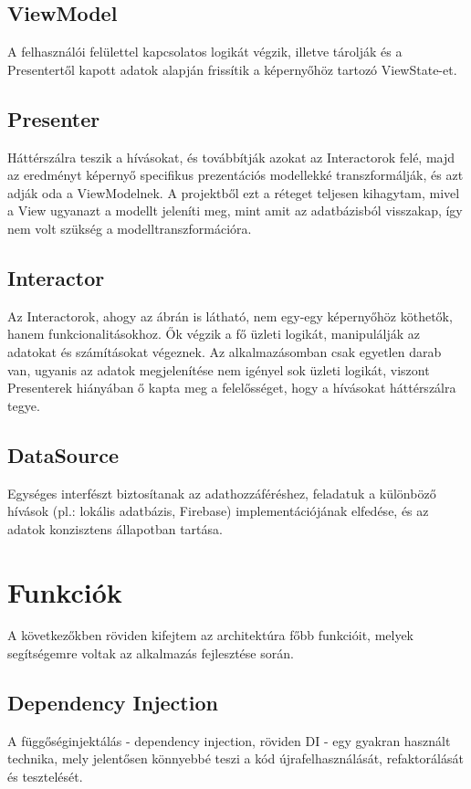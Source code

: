 \subsection{ViewModel}
A felhasználói felülettel kapcsolatos logikát végzik, illetve tárolják és a Presentertől kapott adatok alapján frissítik a képernyőhöz tartozó ViewState-et.

\subsection{Presenter}
Háttérszálra teszik a hívásokat, és továbbítják azokat az Interactorok felé, majd az eredményt képernyő specifikus prezentációs modellekké transzformálják, és azt adják oda a ViewModelnek. A projektből ezt a réteget teljesen kihagytam, mivel a View ugyanazt a modellt jeleníti meg, mint amit az adatbázisból visszakap, így nem volt szükség a modelltranszformációra.

\subsection{Interactor}
Az Interactorok, ahogy az ábrán is látható, nem egy-egy képernyőhöz köthetők, hanem funkcionalitásokhoz. Ők végzik a fő üzleti logikát, manipulálják az adatokat és számításokat végeznek. Az alkalmazásomban csak egyetlen darab van, ugyanis az adatok megjelenítése nem igényel sok üzleti logikát, viszont Presenterek hiányában ő kapta meg a felelősséget, hogy a hívásokat háttérszálra tegye. 

\subsection{DataSource}
Egységes interfészt biztosítanak az adathozzáféréshez, feladatuk a különböző hívások (pl.: lokális adatbázis, Firebase) implementációjának elfedése, és az adatok konzisztens állapotban tartása. 

\section{Funkciók}

A következőkben röviden kifejtem az architektúra főbb funkcióit, melyek segítségemre voltak az alkalmazás fejlesztése során. 

\subsection{Dependency Injection}
A függőséginjektálás - dependency injection, röviden DI - egy gyakran használt technika, mely jelentősen könnyebbé teszi a kód újrafelhasználását, refaktorálását és tesztelését.\cite{DepInjection}

